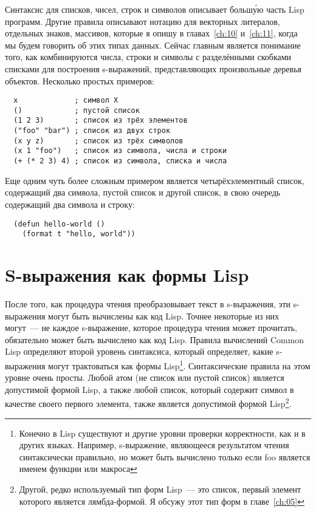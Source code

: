 Синтаксис для списков, чисел, строк и символов описывает больш\'{у}ю часть Lisp
программ. Другие правила описывают нотацию для векторных литералов, отдельных знаков,
массивов, которые я опишу в главах~\ref{ch:10} и~\ref{ch:11}, когда мы будем говорить об этих типах
данных. Сейчас главным является понимание того, как комбинируются числа, строки и символы
с разделёнными скобками списками для построения s-выражений, представляющих произвольные
деревья объектов. Несколько простых примеров:

\begin{lstlisting}
  x             ; символ X
  ()            ; пустой список
  (1 2 3)       ; список из трёх элементов
  ("foo" "bar") ; список из двух строк
  (x y z)       ; список из трёх символов
  (x 1 "foo")   ; список из символа, числа и строки
  (+ (* 2 3) 4) ; список из символа, списка и числа
\end{lstlisting}

Еще одним чуть более сложным примером является четырёхэлементный список, содержащий два
символа, пустой список и другой список, в свою очередь содержащий два символа и строку:

\begin{lstlisting}
  (defun hello-world ()
    (format t "hello, world"))
\end{lstlisting}

\section{S-выражения как формы Lisp}

После того, как процедура чтения преобразовывает текст в s-выражения, эти s-выражения
могут быть вычислены как код Lisp. Точнее некоторые из них могут~--- не каждое s-выражение,
которое процедура чтения может прочитать, обязательно может быть вычислено как код
Lisp. Правила вычислений Common Lisp определяют второй уровень синтаксиса, который
определяет, какие s-выражения могут трактоваться как формы Lisp\footnote{Конечно в Lisp
  существуют и другие уровни проверки корректности, как и в других языках. Например,
  s-выражение, являющееся результатом чтения  синтаксически правильно, но
  может быть вычислено только если foo является именем функции или
  макроса}. Синтаксические правила на этом уровне очень просты. Любой атом (не список или
пустой список) является допустимой формой Lisp, а также любой список, который содержит
символ в качестве своего первого элемента, также является допустимой формой
Lisp\footnote{Другой, редко используемый тип форм Lisp~--- это список, первый элемент
  которого является лямбда-формой. Я обсужу этот тип форм в главе~\ref{ch:05}}.

